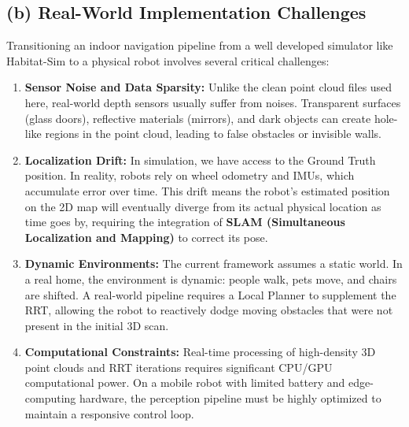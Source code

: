 \documentclass{article}
\begin{document}
\subsection{(b) Real-World Implementation Challenges}

Transitioning an indoor navigation pipeline from a well developed simulator like Habitat-Sim 
to a physical robot involves several critical challenges:

\begin{enumerate}
    \item \textbf{Sensor Noise and Data Sparsity:} Unlike the clean point cloud files used here, 
    real-world depth sensors usually suffer from noises. Transparent surfaces (glass doors), 
    reflective materials (mirrors), and dark objects can create hole-like regions in the point cloud, 
    leading to false obstacles or invisible walls.
    \item \textbf{Localization Drift:} In simulation, we have access to the Ground Truth position. 
    In reality, robots rely on wheel odometry and IMUs, which accumulate error over time. This drift 
    means the robot's estimated position on the 2D map will eventually diverge from its actual physical 
    location as time goes by, requiring the integration of \textbf{SLAM (Simultaneous 
    Localization and Mapping)} to correct its pose.
    \item \textbf{Dynamic Environments:} The current framework assumes a static world. In a 
    real home, the environment is dynamic: people walk, pets move, and chairs are shifted. A 
    real-world pipeline requires a Local Planner to supplement the RRT, allowing the robot to 
    reactively dodge moving obstacles that were not present in the initial 3D scan.
    \item \textbf{Computational Constraints:} Real-time processing of high-density 3D point clouds and 
    RRT iterations requires significant CPU/GPU computational power. On a mobile robot with limited 
    battery and edge-computing hardware, the perception pipeline must be highly optimized to maintain a 
    responsive control loop.
\end{enumerate}
\end{document}

